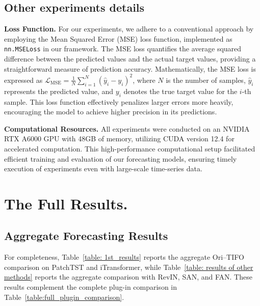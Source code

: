 \documentclass[sigconf,anonymous,review]{acmart}
\begin{document}
\subsection{Other experiments details}
\label{appendix:exp_other_detailes}

\textbf{Loss Function.}
For our experiments, we adhere to a conventional approach by employing the Mean Squared Error (MSE) loss function, implemented as \texttt{nn.MSELoss} in our framework. The MSE loss quantifies the average squared difference between the predicted values and the actual target values, providing a straightforward measure of prediction accuracy. Mathematically, the MSE loss is expressed as
$\mathcal{L}_{\text{MSE}} = \frac{1}{N} \sum_{i=1}^{N} \left( \hat{y}_i - y_i \right)^2$,
where $N$ is the number of samples, $\hat{y}_i$ represents the predicted value, and $y_i$ denotes the true target value for the $i$-th sample. This loss function effectively penalizes larger errors more heavily, encouraging the model to achieve higher precision in its predictions.

\textbf{Computational Resources.}
All experiments were conducted on an NVIDIA RTX A6000 GPU with 48GB of memory, utilizing CUDA version 12.4 for accelerated computation. This high-performance computational setup facilitated efficient training and evaluation of our forecasting models, ensuring timely execution of experiments even with large-scale time-series data.



\section{The Full Results.}

\subsection{Aggregate Forecasting Results}
\label{app:aggregate_results}

For completeness, Table~\ref{table: 1st_results} reports the aggregate
Ori--TIFO comparison on PatchTST and iTransformer, while
Table~\ref{table: results of other methods} reports the aggregate comparison
with RevIN, SAN, and FAN. These results complement the complete plug-in
comparison in Table~\ref{table:full_plugin_comparison}.
\end{document}
